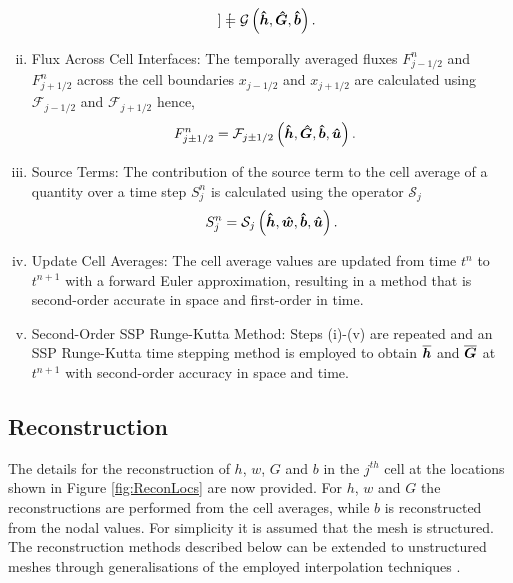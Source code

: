 \begin{enumerate}[(i)]
\begin{equation*}
\begin{bmatrix}
	\end{bmatrix} = \mathcal{G}\left( \boldsymbol{\hat{h}}, \boldsymbol{\hat{G}},\boldsymbol{\hat{b}} \right).
	\end{equation*}
	\item Flux Across Cell Interfaces: The temporally averaged fluxes $F^n_{j-1/2}$ and $F^n_{j+1/2}$ across the cell boundaries $x_{j-1/2}$ and $x_{j+1/2}$ are calculated using $\mathcal{F}_{j-1/2}$ and $\mathcal{F}_{j+1/2}$ hence,
		\begin{align*}	
		F^n_{j\pm 1/2} &=\mathcal{F}_{j\pm 1/2} \left( \boldsymbol{\hat{h}}, \boldsymbol{\hat{G}},\boldsymbol{\hat{b}}, \boldsymbol{\hat{u}}  \right).
		\end{align*}
	\item Source Terms: The contribution of the source term to the cell average of a quantity over a time step $S^n_{j}$ is calculated using the operator $\mathcal{S}_j$
	\begin{equation*}	
	S^n_{j} =\mathcal{S}_{j} \left( \boldsymbol{\hat{h}},\boldsymbol{\hat{w}},\boldsymbol{\hat{b}}, \boldsymbol{\hat{u}}  \right).
	\end{equation*}
	\item Update Cell Averages: The cell average values are updated from time $t^n$ to $t^{n+1}$ with a forward Euler approximation, resulting in a method that is second-order accurate in space and first-order in time.
	\item Second-Order SSP Runge-Kutta Method: Steps (i)-(v) are repeated and an SSP Runge-Kutta time stepping method is employed to obtain $\overline{\boldsymbol{h}}$ and $\overline{\boldsymbol{G}}$ at $t^{n+1}$ with second-order accuracy in space and time.
\end{enumerate}


\subsection{Reconstruction}
\label{subsec:Reconstruction}
The details for the reconstruction of $h$, $w$, $G$ and $b$ in the $j^{th}$ cell at the locations shown in Figure \ref{fig:ReconLocs} are now provided. For $h$, $w$ and $G$ the reconstructions are performed from the cell averages, while $b$ is reconstructed from the nodal values. For simplicity it is assumed that the mesh is structured. The reconstruction methods described below can be extended to unstructured meshes through generalisations of the employed interpolation techniques \cite{Preneter-1975,atkinson-1978}.

